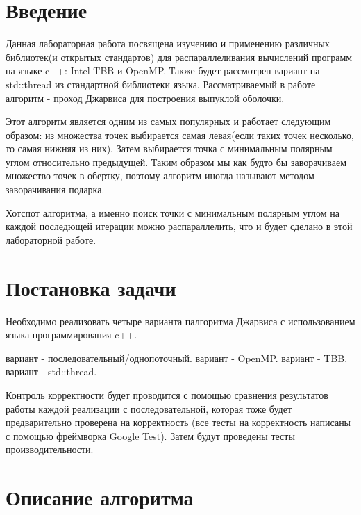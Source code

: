 \documentclass[14pt, a4paper]{extarticle}
\begin{document}
  \pagestyle{plain}
  \setcounter{page}{3}

  \section{Введение}
    Данная лабораторная работа посвящена изучению и применению различных библиотек(и открытых стандартов) для распараллеливания вычислений программ на языке c++: Intel TBB и OpenMP. Также будет рассмотрен вариант на std::thread из стандартной библиотеки языка. Рассматриваемый в работе алгоритм - проход Джарвиса для построения выпуклой оболочки.

    Этот алгоритм является одним из самых популярных и работает следующим образом: из множества точек выбирается самая левая(если таких точек несколько, то самая нижняя из них). Затем выбирается точка с минимальным полярным углом относительно предыдущей. Таким образом мы как будто бы заворачиваем множество точек в обертку, поэтому алгоритм иногда называют методом заворачивания подарка.

    Хотспот алгоритма, а именно поиск точки с минимальным полярным углом на каждой последющей итерации можно распараллелить, что и будет сделано в этой лабораторной работе.

  \newpage

  \section{Постановка задачи}
  Необходимо реализовать четыре варианта палгоритма Джарвиса с использованием языка программирования c++.
   \begin{itemize}
 вариант - последовательный/однопоточный.
 вариант - OpenMP.
 вариант - TBB.
 вариант - std::thread.

\end{itemize}
Контроль корректности будет проводится с помощью сравнения результатов работы каждой реализации с последовательной, которая тоже будет предварительно проверена на корректность (все тесты на корректность написаны с помощью фреймворка Google Test). Затем будут проведены тесты производительности. 
  \newpage

  \section{Описание алгоритма}
\end{document}
